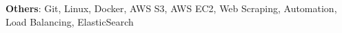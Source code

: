 \textbf{Others}{: Git, Linux, Docker, AWS S3, AWS EC2, Web Scraping, Automation, Load Balancing, ElasticSearch} \\